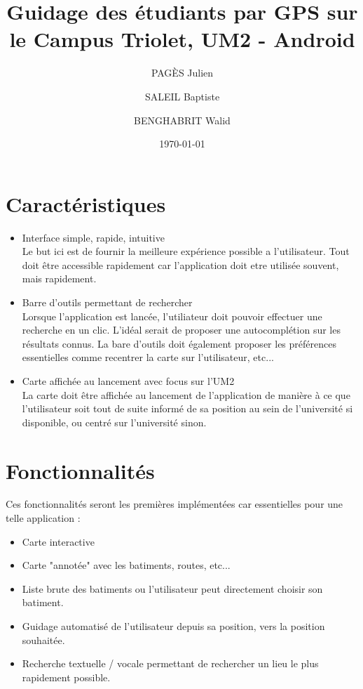 \documentclass{report}
\title{Guidage des étudiants par GPS sur le Campus Triolet, UM2 - Android}
\author{PAGÈS Julien \and SALEIL Baptiste \and BENGHABRIT Walid}
\date{\today}
\begin{document}
	\maketitle
	\thispagestyle{empty}
	
	\section*{Caractéristiques}
	\begin{itemize}
		\item Interface simple, rapide, intuitive \\
			Le but ici est de fournir la meilleure expérience possible a l'utilisateur. Tout doit être accessible rapidement car l'application doit etre utilisée souvent, mais rapidement.
		\item Barre d'outils permettant de rechercher \\
			Lorsque l'application est lancée, l'utiliateur doit pouvoir effectuer une recherche en un clic. L'idéal serait de proposer une autocomplétion sur les résultats connus. La bare d'outils doit également proposer les préférences essentielles comme recentrer la carte sur l'utilisateur, etc...
		\item Carte affichée au lancement avec focus sur l'UM2 \\
			La carte doit être affichée au lancement de l'application de manière à ce que l'utilisateur soit tout de suite informé de sa position au sein de l'université si disponible, ou centré sur l'université sinon.
	\end{itemize}

	\section*{Fonctionnalités}
	Ces fonctionnalités seront les premières implémentées car essentielles pour une telle application :
	\begin{itemize}
		\item Carte interactive
		\item Carte "annotée" avec les batiments, routes, etc...
		\item Liste brute des batiments ou l'utilisateur peut directement choisir son batiment.
		\item Guidage automatisé de l'utilisateur depuis sa position, vers la position souhaitée.
		\item Recherche textuelle / vocale permettant de rechercher un lieu le plus rapidement possible.
	\end{itemize}
	
\end{document}
